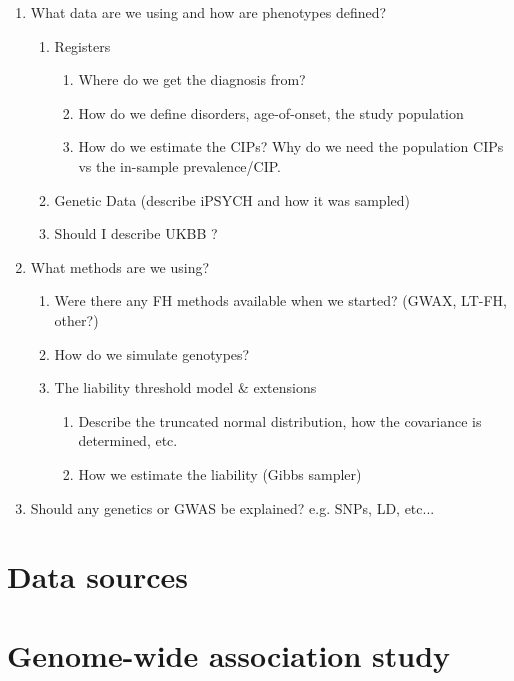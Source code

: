 
\begin{enumerate}
	\item What data are we using and how are phenotypes defined?
		\begin{enumerate}
			\item Registers
			\begin{enumerate}
				\item Where do we get the diagnosis from? 
				\item How do we define disorders, age-of-onset, the study population
				\item How do we estimate the CIPs? Why do we need the population CIPs vs the in-sample prevalence/CIP.
			\end{enumerate}
			\item Genetic Data (describe iPSYCH and how it was sampled)
			\item Should I describe UKBB ?
		\end{enumerate}
	\item What methods are we using?
	\begin{enumerate}
		\item Were there any FH methods available when we started? (GWAX, LT-FH, other?)
		\item How do we simulate genotypes?
		\item The liability threshold model \& extensions
		\begin{enumerate}
			\item Describe the truncated normal distribution, how the covariance is determined, etc.
			\item How we estimate the liability (Gibbs sampler)
		\end{enumerate}
	\end{enumerate} 
	\item Should any genetics or GWAS be explained? e.g. SNPs, LD, etc... 
\end{enumerate}


\section{Data sources}




\section{Genome-wide association study}




